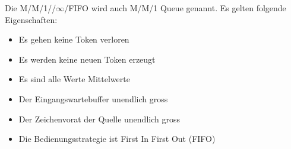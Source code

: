 Die M/M/1/\infty/$\infty$/FIFO wird auch M/M/1 Queue genannt. Es gelten folgende Eigenschaften:



\begin{itemize}
    \item Es gehen keine Token verloren
    \item Es werden keine neuen Token erzeugt
    \item Es sind alle Werte Mittelwerte
    \item Der Eingangswartebuffer unendlich gross
    \item Der Zeichenvorat der Quelle unendlich gross
    \item Die Bedienungsstrategie ist First In First Out (FIFO) 
\end{itemize}

